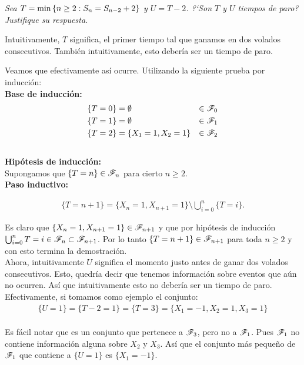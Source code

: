 \emph
{
	Sea $T=\min\left\{ n\geq 2:S_n=S_{n-2} + 2\right\} $ y $U=T-2$. ?`Son $T$ y $U$ 
	tiempos de paro? Justifique su respuesta.\\
}

	Intuitivamente, $T$ significa, el primer tiempo tal que ganamos en dos volados consecutivos.
	También intuitivamente, esto debería ser un tiempo de paro.
	
	Veamos que efectivamente así ocurre. Utilizando la siguiente prueba por inducción:\\
	
	\textbf{Base de inducción:}		
		\begin{align}
			\{T = 0\} 		&= \emptyset  				& 	\in \mathscr{F}_0 \\
			\{T = 1\} 		&= \emptyset  				& 	\in \mathscr{F}_1 \\
			\{T = 2\} 		&= \{ X_1 = 1, X_2 = 1\} 	&	\in \mathscr{F}_2
		\end{align}	\\					
	
	\textbf{Hipótesis de inducción:}\\
	
		Supongamos que $\{T = n\} \in \mathscr{F}_n$ para cierto $n \geq 2$.\\
		
	\textbf{Paso inductivo:}
		
		\begin{align}
			\{T = n + 1 \} = \{ X_n = 1, X_{n+1} = 1\} \setminus \bigcup_{i=0}^{n} \{T = i\}.
		\end{align}				
	
		Es claro que $\{ X_n = 1, X_{n+1} = 1\} \in \mathscr{F}_{n + 1}$ y que por hipótesis de inducción
		$\bigcup_{i=0}^{n} {T = i} \in \mathscr{F}_n \subset \mathscr{F}_{n + 1}$. Por lo tanto
		$\{T = n + 1 \} \in \mathscr{F}_{n+1}$ para toda $n \geq 2$ y con esto termina la demostración.\\
		
	Ahora, intuitivamente $U$ significa el momento justo antes de ganar dos volados consecutivos.
	Esto, quedría decir que tenemos información sobre eventos que aún no ocurren. Así que intuitivamente
	esto no debería ser un tiempo de paro.\\
	
	Efectivamente, si tomamos como ejemplo el conjunto: 
		\begin{align}
			\{ U = 1 \} = \{ T - 2 = 1\} = \{ T = 3\} = \{X_1 = -1, X_2 = 1, X_3 = 1\}
		\end{align}		\\
			
	Es fácil notar que es un conjunto que pertenece a $\mathscr{F}_3$, pero no a $\mathscr{F}_1$. Pues $\mathscr{F}_1$
	no contiene información alguna sobre $X_2$ y $X_3$. Así que el conjunto más pequeño de $\mathscr{F}_1$ 
	que contiene a $\{ U = 1 \}$ es $\{ X_1 = -1 \}$.\\
